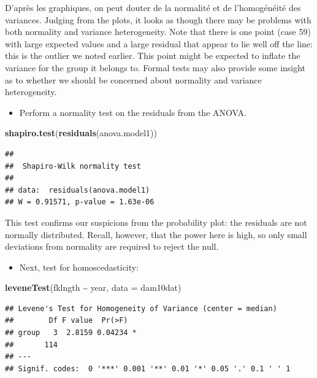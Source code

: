 \documentclass[
  12pt,
]{book}
\newenvironment{Shaded}{\begin{snugshade}}{\end{snugshade}}
\newcommand{\DataTypeTok}[1]{\textcolor[rgb]{0.13,0.29,0.53}{#1}}
\newcommand{\KeywordTok}[1]{\textcolor[rgb]{0.13,0.29,0.53}{\textbf{#1}}}
\newcommand{\NormalTok}[1]{#1}
\newcommand{\OperatorTok}[1]{\textcolor[rgb]{0.81,0.36,0.00}{\textbf{#1}}}
\newcommand{\StringTok}[1]{\textcolor[rgb]{0.31,0.60,0.02}{#1}}
\providecommand{\tightlist}{%
  \setlength{\itemsep}{0pt}\setlength{\parskip}{0pt}}
\begin{document}
D'après les graphiques, on peut douter de la normalité et de l'homogénéité des variances. Judging from the plots, it looks as though there may be problems with both normality and variance heterogeneity. Note that there is one point (case 59) with large expected values and a large residual that appear to lie well off the line: this is the outlier we noted earlier. This point might be expected to inflate the variance for the group it belongs to. Formal tests may also provide some insight as to whether we should be concerned about normality and variance heterogeneity.

\begin{itemize}
\tightlist
\item
  Perform a normality test on the residuals from the ANOVA.
\end{itemize}

\begin{Shaded}
\begin{Highlighting}[]
\KeywordTok{shapiro.test}\NormalTok{(}\KeywordTok{residuals}\NormalTok{(anova.model1))}
\end{Highlighting}
\end{Shaded}

\begin{verbatim}
## 
##  Shapiro-Wilk normality test
## 
## data:  residuals(anova.model1)
## W = 0.91571, p-value = 1.63e-06
\end{verbatim}

This test confirms our suspicions from the probability plot: the residuals are not normally distributed. Recall, however, that the power here is high, so only small deviations from normality are required to reject the null.

\begin{itemize}
\tightlist
\item
  Next, test for homoscedasticity:
\end{itemize}

\begin{Shaded}
\begin{Highlighting}[]
\KeywordTok{leveneTest}\NormalTok{(fklngth }\OperatorTok{\textasciitilde{}}\StringTok{ }\NormalTok{year, }\DataTypeTok{data =}\NormalTok{ dam10dat)}
\end{Highlighting}
\end{Shaded}

\begin{verbatim}
## Levene's Test for Homogeneity of Variance (center = median)
##        Df F value  Pr(>F)  
## group   3  2.8159 0.04234 *
##       114                  
## ---
## Signif. codes:  0 '***' 0.001 '**' 0.01 '*' 0.05 '.' 0.1 ' ' 1
\end{verbatim}
\end{document}
